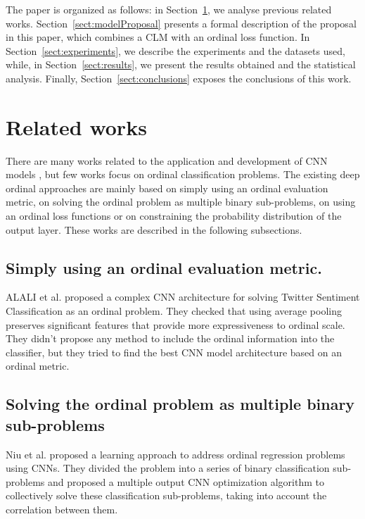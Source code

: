 \documentclass[journal]{IEEEtran}
\begin{document}
	The paper is organized as follows: in Section~\ref{sect:relatedwork}, we analyse previous related works. Section~\ref{sect:modelProposal} presents a formal description of the proposal in this paper, which combines a CLM with an ordinal loss function. In Section~\ref{sect:experiments}, we describe the experiments and the datasets used, while, in Section~\ref{sect:results}, we present the results obtained and the statistical analysis. Finally, Section~\ref{sect:conclusions} exposes the conclusions of this work.
	
	\section{Related works}
	\label{sect:relatedwork}
	There are many works related to the application and development of CNN models \cite{liu2017deep}, but few works focus on ordinal classification problems. The existing deep ordinal approaches are mainly based on simply using an ordinal evaluation metric, on solving the ordinal problem as multiple binary sub-problems, on using an ordinal loss functions or on constraining the probability distribution of the output layer. These works are described in the following subsections.
	
	
	\subsection{Simply using an ordinal evaluation metric.}
		
	ALALI et al. \cite{alali2018multi} proposed a complex CNN architecture for solving Twitter Sentiment Classification as an ordinal problem. They checked that using average pooling preserves significant features that provide more expressiveness to ordinal scale. They didn't propose any method to include the ordinal information into the classifier, but they tried to find the best CNN model architecture based on an ordinal metric.

	\subsection{Solving the ordinal problem as multiple binary sub-problems}
	
	Niu et al. \cite{niu2016ordinal} proposed a learning approach to address ordinal regression problems using CNNs. They divided the problem into a series of binary classification sub-problems and proposed a multiple output CNN optimization algorithm to collectively solve these classification sub-problems, taking into account the correlation between them.
	
\end{document}
